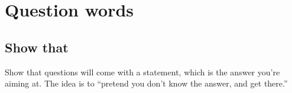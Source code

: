 \section{Question words}
\subsection{Show that}
Show that questions will come with a statement, which is the answer you're aiming at. The idea is to ``pretend you don't know the answer, and get there.''
